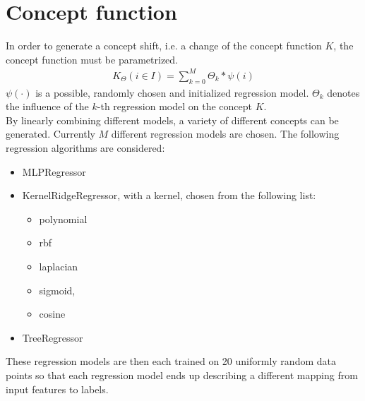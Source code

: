 \documentclass[12pt,a4paper,oneside,ngerman]{article}
\newcommand{\Concept}{K}
\theoremstyle{plain}
\begin{document}
	\section{Concept function}
	In order to generate a concept shift, i.e. a change of the concept function $K$, the concept function must be parametrized.
	\begin{align*}
		K_\Theta (i \in I) = \sum_{k=0}^{M}\Theta_k *\psi(i)
	\end{align*}
	$\psi(\cdot)$ is a possible, randomly chosen and initialized regression model. $\Theta_k$ denotes the influence of the $k$-th regression model on the concept $\Concept$.\\ 
	By linearly combining different models, a variety of different concepts can be generated.
	Currently $M$ different regression models are chosen. The following regression algorithms are considered:
	\begin{itemize}
		\item MLPRegressor
		\item KernelRidgeRegressor, with a kernel, chosen from the following list:
			\begin{itemize}
				\item polynomial
				\item rbf
				\item laplacian
				\item sigmoid,
				\item cosine
			\end{itemize}
		\item TreeRegressor
	\end{itemize}
	These regression models are then each trained on 20 uniformly random data points so that each regression model ends up describing a different mapping from input features to labels.
	
\end{document}
